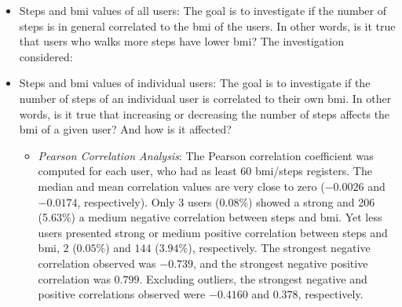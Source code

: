 \documentclass[11pt]{iopart}
\begin{document}
\begin{itemize}
\item Steps and bmi values of all users:
The goal is to investigate if the number of steps is in general correlated to the bmi of the users. In other words, is it true that users who walks more steps have lower bmi?
The investigation considered:



\item Steps and bmi values of individual users:
The goal is to investigate if the number of steps of an individual user is correlated to their own bmi. In other words, is it true that increasing or decreasing the number of steps affects the bmi of a given user? And how is it affected?

\begin{itemize}
\item \textit{Pearson Correlation Analysis}:  The Pearson correlation coefficient was computed for each user, who had as least 60 bmi/steps registers. The median  and mean correlation values are very close to zero  
($-0.0026$ and $-0.0174$, respectively). Only 3 users (0.08\%) showed a strong and 206 (5.63\%) a medium negative correlation between steps and bmi.
Yet less users presented strong or medium positive correlation between steps and bmi, $2$ ($0.05\%$) and $144$ ($3.94\%$), respectively.
The strongest negative correlation observed was $-0.739$, and the strongest negative positive correlation was $0.799$. 
Excluding outliers, the strongest negative and positive correlations observed were $-0.4160$ and $0.378$, respectively.




\end{itemize}
\end{itemize}
\end{document}
